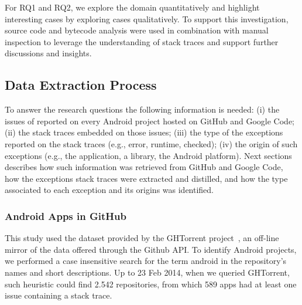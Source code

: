 \documentclass[conference]{IEEEtran}
\begin{document}


For RQ1 and RQ2, we explore the domain quantitatively and highlight interesting cases by 
exploring cases qualitatively. To support this investigation, source code and bytecode 
analysis were used in combination with manual inspection to leverage the  understanding 
of stack traces and support further discussions and insights. 


\subsection{Data Extraction Process}
\label{sec:miningproc}

To answer the research questions the following information is needed: (i) the issues of reported on every Android project hosted on 
GitHub and Google Code; (ii) the stack traces embedded on those issues; (iii) the type of the exceptions
 reported on the stack traces (e.g., error, runtime, checked); (iv) the origin of such exceptions 
(e.g., the application, a library, the Android platform). Next sections describes how such information 
was retrieved from GitHub and Google Code, how the exceptions stack traces were extracted and distilled,
 and how the type associated to each exception and its origins was identified.


\subsubsection{Android Apps in GitHub}
\label{sec:git}


This study used the dataset provided by the GHTorrent project~\cite{Gousi13}, 
an off-line mirror of the data  offered through the Github API.  
To identify Android projects, we performed a case insensitive search for the
term \textsf{android} in the repository's names and short descriptions.  
Up to 23 Feb 2014,  when we queried GHTorrent, such heuristic could
 find 2.542 repositories,  from which 589 apps had at least one
issue containing a stack trace.
\end{document}
